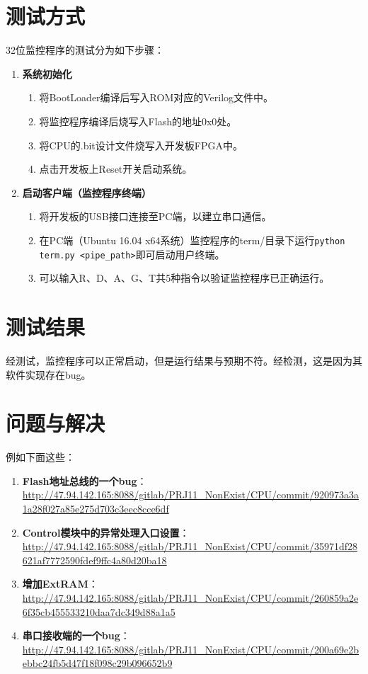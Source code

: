 \section{测试方式}

32位监控程序的测试分为如下步骤：

\begin{enumerate}
    \item {\bf 系统初始化}

    \begin{enumerate}
        \item 将BootLoader编译后写入ROM对应的Verilog文件中。
        \item 将监控程序编译后烧写入Flash的地址0x0处。
        \item 将CPU的.bit设计文件烧写入开发板FPGA中。
        \item 点击开发板上Reset开关启动系统。
    \end{enumerate}

    \item {\bf 启动客户端（监控程序终端）}

    \begin{enumerate}
        \item 将开发板的USB接口连接至PC端，以建立串口通信。
        \item 在PC端（Ubuntu 16.04 x64系统）监控程序的term/目录下运行\texttt{python term.py <pipe\_path>}即可启动用户终端。
        \item 可以输入R、D、A、G、T共5种指令以验证监控程序已正确运行。
    \end{enumerate}

\end{enumerate}

\section{测试结果}


经测试，监控程序可以正常启动，但是运行结果与预期不符。经检测，这是因为其软件实现存在bug。

\section{问题与解决}

例如下面这些：

\begin{enumerate}
    \item {\bf Flash地址总线的一个bug}：\url{http://47.94.142.165:8088/gitlab/PRJ11_NonExist/CPU/commit/920973a3a1a28f027a85e275d703c3eec8cce6df}
    \item {\bf Control模块中的异常处理入口设置}：\url{http://47.94.142.165:8088/gitlab/PRJ11_NonExist/CPU/commit/35971df28621af7772590fdef9ffc4a80d20ba18}
    \item {\bf 增加ExtRAM}：\url{http://47.94.142.165:8088/gitlab/PRJ11_NonExist/CPU/commit/260859a2e6f35cb455533210daa7dc349d88a1a5}
    \item {\bf 串口接收端的一个bug}：\url{http://47.94.142.165:8088/gitlab/PRJ11_NonExist/CPU/commit/200a69e2bebbc24fb5d47f18f098c29b096652b9}
\end{enumerate}
